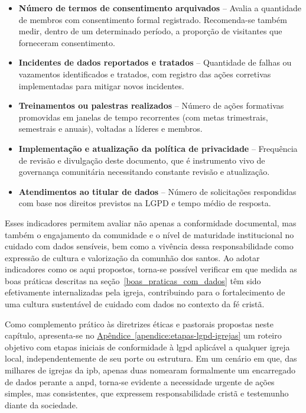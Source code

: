 \begin{itemize}
    \item \textbf{Número de termos de consentimento arquivados} – Avalia a quantidade de membros com consentimento formal registrado. Recomenda-se também medir, dentro de um determinado período, a proporção de visitantes que forneceram consentimento.
    \item \textbf{Incidentes de dados reportados e tratados} – Quantidade de falhas ou vazamentos identificados e tratados, com registro das ações corretivas implementadas para mitigar novos incidentes.
    \item \textbf{Treinamentos ou palestras realizados} – Número de ações formativas promovidas em janelas de tempo recorrentes (com metas trimestrais, semestrais e anuais), voltadas a líderes e membros.
    \item \textbf{Implementação e atualização da política de privacidade} – Frequência de revisão e divulgação deste documento, que é instrumento vivo de governança comunitária necessitando constante revisão e atualização.
    \item \textbf{Atendimentos ao titular de dados} – Número de solicitações respondidas com base nos direitos previstos na LGPD e tempo médio de resposta.
\end{itemize}

Esses indicadores permitem avaliar não apenas a conformidade documental, mas também o engajamento da comunidade e o nível de maturidade institucional no cuidado com dados sensíveis, bem como a vivência dessa responsabilidade como expressão de cultura e valorização da comunhão dos santos. Ao adotar indicadores como os aqui propostos, torna-se possível verificar em que medida as boas práticas descritas na seção~\ref{boas_praticas_com_dados} têm sido efetivamente internalizadas pela igreja, contribuindo para o fortalecimento de uma cultura sustentável de cuidado com dados no contexto da fé cristã.

Como complemento prático às diretrizes éticas e pastorais propostas neste capítulo, apresenta-se no \hyperref[apendice:etapas-lgpd-igrejas]{Apêndice~\ref*{apendice:etapas-lgpd-igrejas}} um roteiro objetivo com etapas iniciais de conformidade à \gls{lgpd} aplicável a qualquer igreja local, independentemente de seu porte ou estrutura. Em um cenário em que, das milhares de igrejas da \gls{ipb}, apenas duas nomearam formalmente um encarregado de dados perante a \gls{anpd}, torna-se evidente a necessidade urgente de ações simples, mas consistentes, que expressem responsabilidade cristã e testemunho diante da sociedade.
